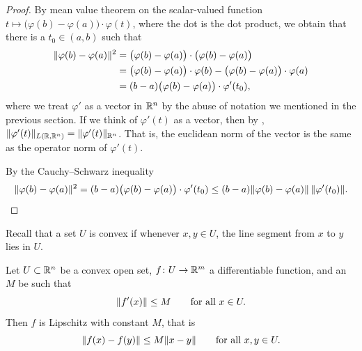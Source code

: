 \begin{proof}
By mean value theorem on the scalar-valued function
$t \mapsto \bigl(\varphi(b)-\varphi(a) \bigr) \cdot \varphi(t)$,
where the dot is the dot product, we obtain
that
there is a $t_0 \in (a,b)$ such that
\begin{equation*}
\begin{split}
\lVert {\varphi(b)-\varphi(a)} \rVert^2
& =
\bigl( \varphi(b)-\varphi(a) \bigr)
\cdot
\bigl( \varphi(b)-\varphi(a) \bigr)
\\
& =
\bigl(\varphi(b)-\varphi(a) \bigr) \cdot \varphi(b) - 
\bigl(\varphi(b)-\varphi(a) \bigr) \cdot \varphi(a)
\\
& = 
(b-a)
\bigl(\varphi(b)-\varphi(a) \bigr) \cdot \varphi'(t_0) ,
\end{split}
\end{equation*}
where we treat $\varphi'$ as a vector in ${\mathbb{R}}^n$ by the abuse of
notation we mentioned in the previous section.
If we think of $\varphi'(t)$ as a vector, then by
,
$\lVert {\varphi'(t)} \rVert_{L({\mathbb{R}},{\mathbb{R}}^n)} = \lVert {\varphi'(t)} \rVert_{{\mathbb{R}}^n}$.
That is, the euclidean norm of the vector is the same as the operator norm
of $\varphi'(t)$.

By the Cauchy--Schwarz inequality
\begin{equation*}
\lVert {\varphi(b)-\varphi(a)} \rVert^2
=
(b-a)\bigl(\varphi(b)-\varphi(a) \bigr) \cdot \varphi'(t_0)
\leq
(b-a)
\lVert {\varphi(b)-\varphi(a)} \rVert \, \lVert {\varphi'(t_0)} \rVert . \qedhere
\end{equation*}
\end{proof}

Recall that a set $U$ is convex
if whenever $x,y \in U$, the line segment from
$x$ to $y$ lies in $U$.

\begin{prop} \label{mv:prop:convexlip}
Let $U \subset {\mathbb{R}}^n$ be a convex open set, $f \colon U \to {\mathbb{R}}^m$
a differentiable function, and an $M$ be such that
\begin{equation*}
\lVert {f'(x)} \rVert \leq M
\qquad \text{for all } x \in U.
\end{equation*}
Then $f$ is Lipschitz with constant $M$, that is
\begin{equation*}
\lVert {f(x)-f(y)} \rVert \leq M \lVert {x-y} \rVert
\qquad
\text{for all } x,y \in U.
\end{equation*}
\end{prop}


